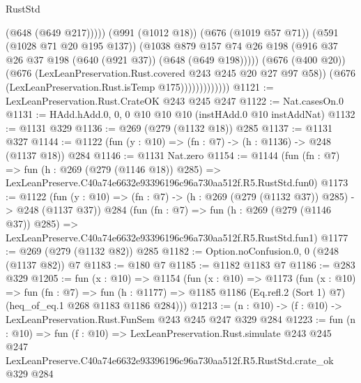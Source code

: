\begin{lexlean}{RustStd}
\begin{coremodule}
                                  (@648 (@649 @217)))))
                            (@991 (@1012 @18))
                            (@676 (@1019 @57 @71))
                            (@591 (@1028 @71 @20 @195 @137))
                            (@1038
                              @879
                              @157
                              @74
                              @26
                              @198
                              (@916 @37 @26 @37 @198 (@640 (@921 @37)) (@648 (@649 @198)))))
                          (@676 (@400 @20))
                          (@676 (LexLeanPreservation.Rust.covered @243 @245 @20 @27 @97 @58))
                          (@676 (LexLeanPreservation.Rust.isTemp @175)))))))))))))
@1121 := LexLeanPreservation.Rust.CrateOK @243 @245 @247
@1122 := Nat.casesOn.{0}
@1131 := HAdd.hAdd.{0, 0, 0} @10 @10 @10 (instHAdd.{0} @10 instAddNat)
@1132 := @1131 @329
@1136 := @269 (@279 (@1132 @18)) @285
@1137 := @1131 @327
@1144 := @1122 (fun (y : @10) => (fn : @7) -> (h : @1136) -> @248 (@1137 @18)) @284
@1146 := @1131 Nat.zero
@1154 := @1144
    (fun (fn : @7) =>
    fun (h : @269 (@279 (@1146 @18)) @285) =>
    LexLeanPreserve.C40a74e6632e93396196c96a730aa512f.R5.RustStd.fun0)
@1173 := @1122
    (fun (y : @10) => (fn : @7) -> (h : @269 (@279 (@1132 @37)) @285) -> @248 (@1137 @37))
    @284
    (fun (fn : @7) =>
    fun (h : @269 (@279 (@1146 @37)) @285) =>
    LexLeanPreserve.C40a74e6632e93396196c96a730aa512f.R5.RustStd.fun1)
@1177 := @269 (@279 (@1132 @82)) @285
@1182 := Option.noConfusion.{0, 0} (@248 (@1137 @82)) @7
@1183 := @180 @7
@1185 := @1182 @1183 @7
@1186 := @283 @329
@1205 := fun (x : @10) =>
  @1154
    (fun (x : @10) =>
    @1173
      (fun (x : @10) =>
      fun (fn : @7) =>
      fun (h : @1177) =>
      @1185 @1186 (Eq.refl.{2} (Sort 1) @7) (heq_of_eq.{1} @268 @1183 @1186 @284)))
@1213 := (n : @10) -> (f : @10) -> LexLeanPreservation.Rust.FunSem @243 @245 @247 @329 @284
@1223 := fun (n : @10) =>
  fun (f : @10) =>
  LexLeanPreservation.Rust.simulate
    @243
    @245
    @247
    LexLeanPreserve.C40a74e6632e93396196c96a730aa512f.R5.RustStd.crate_ok
    @329
    @284
\end{coremodule}
\end{lexlean}
